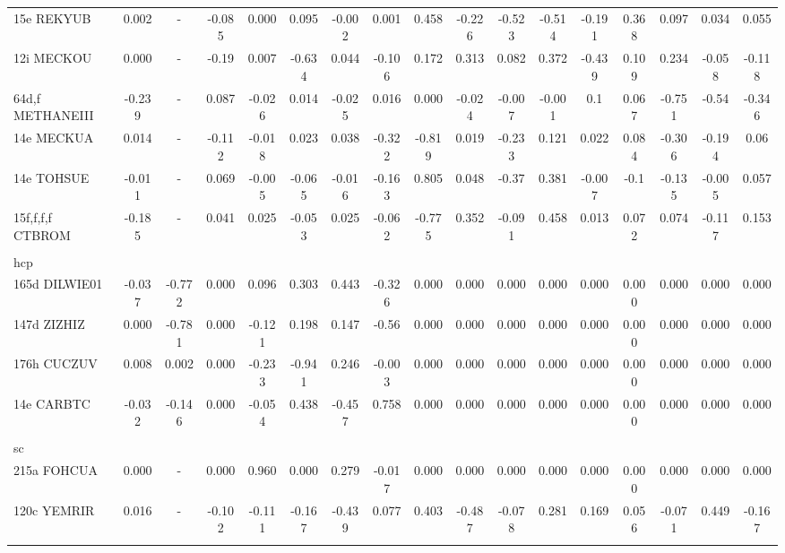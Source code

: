 \documentclass[preprint]{revtex4}
\begin{document}
\begin{table}[!ht]
\begin{tabular}{lcccccccccccccccc}
15e REKYUB & 0.002 & - & -0.085 & 0.000 & 0.095 & -0.002 & 0.001 & 0.458 & -0.226 & -0.523 & -0.514 & -0.191 & 0.368 & 0.097 & 0.034 & 0.055 \\
12i MECKOU & 0.000 & - & -0.19 & 0.007 & -0.634 & 0.044 & -0.106 & 0.172 & 0.313 & 0.082 & 0.372 & -0.439 & 0.109 & 0.234 & -0.058 & -0.118 \\
64d,f METHANEIII & -0.239 & - & 0.087 & -0.026 & 0.014 & -0.025 & 0.016 & 0.000 & -0.024 & -0.007 & -0.001 & 0.1 & 0.067 & -0.751 & -0.54 & -0.346 \\
14e MECKUA & 0.014 & - & -0.112 & -0.018 & 0.023 & 0.038 & -0.322 & -0.819 & 0.019 & -0.233 & 0.121 & 0.022 & 0.084 & -0.306 & -0.194 & 0.06 \\
14e TOHSUE & -0.011 & - & 0.069 & -0.005 & -0.065 & -0.016 & -0.163 & 0.805 & 0.048 & -0.37 & 0.381 & -0.007 & -0.1 & -0.135 & -0.005 & 0.057 \\
15f,f,f,f CTBROM & -0.185 & - & 0.041 & 0.025 & -0.053 & 0.025 & -0.062 & -0.775 & 0.352 & -0.091 & 0.458 & 0.013 & 0.072 & 0.074 & -0.117 & 0.153 \\
\\
hcp\\
165d DILWIE01 & -0.037 & -0.772 & 0.000  & 0.096 & 0.303 & 0.443 & -0.326 & 0.000  & 0.000  & 0.000  & 0.000  & 0.000  & 0.000  & 0.000  & 0.000 & 0.000 \\
147d ZIZHIZ & 0.000 & -0.781 & 0.000 & -0.121 & 0.198 & 0.147 & -0.56 & 0.000 & 0.000 & 0.000 & 0.000 & 0.000 & 0.000 & 0.000 & 0.000 & 0.000 \\
176h CUCZUV & 0.008 & 0.002 & 0.000  & -0.233 & -0.941 & 0.246 & -0.003 & 0.000  & 0.000  & 0.000  & 0.000  & 0.000  & 0.000  & 0.000  & 0.000  & 0.000  \\
14e CARBTC & -0.032 & -0.146 & 0.000 & -0.054 & 0.438 & -0.457 & 0.758 & 0.000 & 0.000 & 0.000 & 0.000 & 0.000 & 0.000 & 0.000 & 0.000 & 0.000 \\
\\
sc\\
215a FOHCUA & 0.000 & - & 0.000 & 0.960 & 0.000 & 0.279 & -0.017 & 0.000 & 0.000 & 0.000 & 0.000 & 0.000 & 0.000 & 0.000 & 0.000 & 0.000 \\
120c YEMRIR & 0.016 & - & -0.102 & -0.111 & -0.167 & -0.439 & 0.077 & 0.403 & -0.487 & -0.078 & 0.281 & 0.169 & 0.056 & -0.071 & 0.449 & -0.167\\
\hline\\
\end{tabular}
\end{table}
\end{document}
